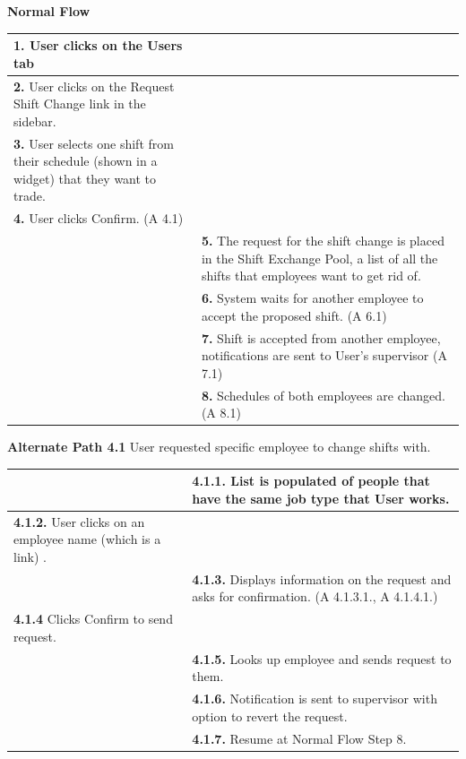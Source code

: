 \documentclass[letterpaper,12pt]{report}
\begin{document}
{ \centering \textbf{Normal Flow}
\begin{center}
\xuchead
\begin{tabular}{| p{8.5cm} | p{8.5cm} |}
\hline
\textbf{1.} User clicks on the Users tab & \\
\hline
\textbf{2.} User clicks on the Request Shift Change link in the sidebar. & \\
\hline
\textbf{3.} User selects one shift from their schedule (shown in a widget) that they want to trade.  & \\
\hline
\textbf{4.} User clicks Confirm. (A 4.1) & \\
\hline
& \textbf{5.} The request for the shift change is placed in the Shift Exchange Pool, a list of all the shifts that employees want to get rid of. \\
\hline
& \textbf{6.} System\index{system} waits for another employee to accept the proposed shift. (A 6.1) \\
\hline
& \textbf{7.} Shift is accepted from another employee, notifications are sent to User’s supervisor (A 7.1) \\
\hline
& \textbf{8.} Schedules of both employees are changed. (A 8.1) \\
\hline
\end{tabular}
\end{center}
\pagebreak

\centering \textbf{Alternate Path 4.1}
\linebreak User requested specific employee to change shifts with.
\begin{center}
\xuchead
\begin{tabular}{| p{8.5cm} | p{8.5cm} |}
\hline
& \textbf{4.1.1.} List is populated of people that have the same job type that User works. \\
\hline
\textbf{4.1.2.} User clicks on an employee name (which is a link) . &  \\
\hline
& \textbf{4.1.3.} Displays information on the request and asks for confirmation. (A 4.1.3.1., A 4.1.4.1.) \\
\hline
\textbf{4.1.4} Clicks Confirm to send request. & \\
\hline
& \textbf{4.1.5.} Looks up employee and sends request to them. \\
\hline
& \textbf{4.1.6.} Notification is sent to supervisor with option to revert the request. \\
\hline
& \textbf{4.1.7.} Resume at Normal Flow Step 8. \\
\hline
\end{tabular}
\end{center}

}
\end{document}

